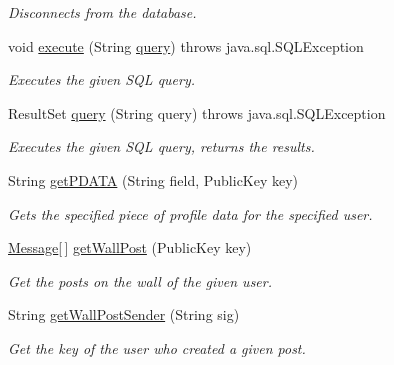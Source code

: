 \begin{DoxyCompactItemize}
\begin{DoxyCompactList}\small\item\em Disconnects from the database. \end{DoxyCompactList}\item 
void \hyperlink{classballmerpeak_1_1turtlenet_1_1server_1_1Database_a717872aaaaf6529490c31465f2952219}{execute} (String \hyperlink{classballmerpeak_1_1turtlenet_1_1server_1_1Database_a4401c37a89ca60d2e6b926b9930446dc}{query})  throws java.\-sql.\-S\-Q\-L\-Exception 
\begin{DoxyCompactList}\small\item\em Executes the given S\-Q\-L query. \end{DoxyCompactList}\item 
Result\-Set \hyperlink{classballmerpeak_1_1turtlenet_1_1server_1_1Database_a4401c37a89ca60d2e6b926b9930446dc}{query} (String query)  throws java.\-sql.\-S\-Q\-L\-Exception 
\begin{DoxyCompactList}\small\item\em Executes the given S\-Q\-L query, returns the results. \end{DoxyCompactList}\item 
String \hyperlink{classballmerpeak_1_1turtlenet_1_1server_1_1Database_ab2e0d804fa40eb9b08275f2548737b34}{get\-P\-D\-A\-T\-A} (String field, Public\-Key key)
\begin{DoxyCompactList}\small\item\em Gets the specified piece of profile data for the specified user. \end{DoxyCompactList}\item 
\hyperlink{classballmerpeak_1_1turtlenet_1_1shared_1_1Message}{Message}\mbox{[}$\,$\mbox{]} \hyperlink{classballmerpeak_1_1turtlenet_1_1server_1_1Database_a095f1356c13e33debb06929244b98150}{get\-Wall\-Post} (Public\-Key key)
\begin{DoxyCompactList}\small\item\em Get the posts on the wall of the given user. \end{DoxyCompactList}\item 
String \hyperlink{classballmerpeak_1_1turtlenet_1_1server_1_1Database_a6c5618c6a7e144ee7eec9e6e4de6314d}{get\-Wall\-Post\-Sender} (String sig)
\begin{DoxyCompactList}\small\item\em Get the key of the user who created a given post. \end{DoxyCompactList}\item 

\end{DoxyCompactItemize}
